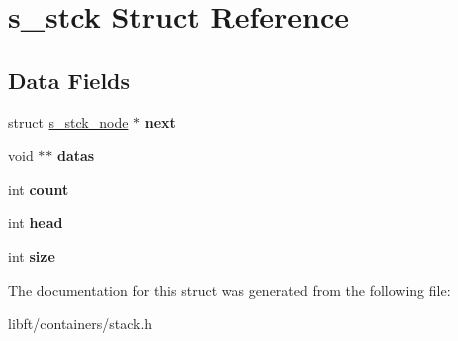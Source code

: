 \hypertarget{structs__stck}{}\section{s\+\_\+stck Struct Reference}
\label{structs__stck}
\subsection*{Data Fields}
\begin{DoxyCompactItemize}
\item 
\hypertarget{structs__stck_a6e6b00688f7c9f0a28d807630c719191}{}struct \hyperlink{structs__stck__node}{s\+\_\+stck\+\_\+node} $\ast$ {\bfseries next}\label{structs__stck_a6e6b00688f7c9f0a28d807630c719191}

\item 
\hypertarget{structs__stck_ae895643bf43a5293b9fd868fcfd0d632}{}void $\ast$$\ast$ {\bfseries datas}\label{structs__stck_ae895643bf43a5293b9fd868fcfd0d632}

\item 
\hypertarget{structs__stck_ad43c3812e6d13e0518d9f8b8f463ffcf}{}int {\bfseries count}\label{structs__stck_ad43c3812e6d13e0518d9f8b8f463ffcf}

\item 
\hypertarget{structs__stck_a20358970b1abaf992eb85e071e454653}{}int {\bfseries head}\label{structs__stck_a20358970b1abaf992eb85e071e454653}

\item 
\hypertarget{structs__stck_a439227feff9d7f55384e8780cfc2eb82}{}int {\bfseries size}\label{structs__stck_a439227feff9d7f55384e8780cfc2eb82}

\end{DoxyCompactItemize}


The documentation for this struct was generated from the following file\+:\begin{DoxyCompactItemize}
\item 
libft/containers/stack.\+h\end{DoxyCompactItemize}
